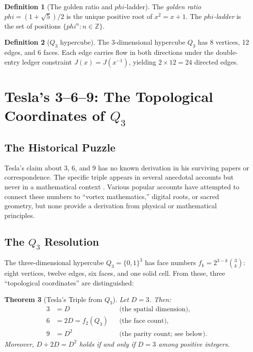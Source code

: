 \documentclass[11pt]{article}
\def\leanverified{}
\def\phig{phi}
\def\Jcost{J}
\theoremstyle{plain}
\newtheorem{theorem}{Theorem}[section]
\theoremstyle{definition}
\newtheorem{definition}[theorem]{Definition}
\theoremstyle{remark}
\newcommand{\leanverified}{\textsuperscript{\textnormal{[\textsc{Lean}]}}}
\newcommand{\Z}{\mathbb{Z}}
\newcommand{\phig}{\varphi}
\newcommand{\Jcost}{J}
\begin{document}
\begin{definition}[The golden ratio and $\phig$-ladder]\label{def:phi-ladder}
The \emph{golden ratio} $\phig = (1+\sqrt{5})/2$ is the unique positive root
of $x^2 = x + 1$. The \emph{$\phig$-ladder} is the set of positions
$\{\phig^n : n \in \Z\}$.
\end{definition}

\begin{definition}[$Q_3$ hypercube]\label{def:Q3}
The 3-dimensional hypercube $Q_3$ has 8 vertices, 12 edges, and 6 faces.
Each edge carries flow in both directions under the double-entry ledger
constraint $\Jcost(x) = \Jcost(x^{-1})$, yielding $2 \times 12 = 24$ directed edges.
\end{definition}

\section{Tesla's 3--6--9: The Topological Coordinates of $Q_3$}
\label{sec:tesla}

\subsection{The Historical Puzzle}

Tesla's claim about 3, 6, and 9 has no known derivation in his surviving papers or correspondence.
The specific triple appears in several anecdotal accounts but never in a mathematical context \cite{Carlson2013}.
Various popular accounts have attempted to connect these numbers to ``vortex mathematics,'' digital roots, or sacred geometry, but none provide a derivation from physical or mathematical principles.

\subsection{The $Q_3$ Resolution}

The three-dimensional hypercube $Q_3 = \{0,1\}^3$ has face numbers $f_k = 2^{3-k}\binom{3}{k}$: eight vertices, twelve edges, six faces, and one solid cell.
From these, three ``topological coordinates'' are distinguished:

\begin{theorem}[Tesla's Triple from $Q_3$]\leanverified\label{thm:tesla}
Let $D = 3$.
Then:
\begin{align}
3 &= D &&\text{(the spatial dimension)}, \label{eq:three} \\
6 &= 2D = f_2(Q_3) &&\text{(the face count)}, \label{eq:six} \\
9 &= D^2 &&\text{(the parity count; see below)}. \label{eq:nine}
\end{align}
Moreover, $D + 2D = D^2$ holds if and only if $D = 3$ among positive integers.
\end{theorem}
\end{document}
